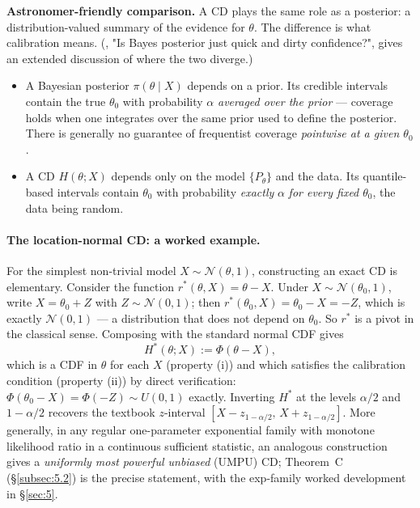 \documentclass[11pt]{article}
\providecommand{\tightlist}{\setlength{\itemsep}{0pt}\setlength{\parskip}{0pt}}
\begin{document}
\textbf{Astronomer-friendly comparison.} A CD plays the same role as a
posterior: a distribution-valued summary of the evidence for \(\theta\).
The difference is what calibration means. (\citealp{Fraser2011}, "Is
Bayes posterior just quick and dirty confidence?", gives an extended
discussion of where the two diverge.)

\begin{itemize}
\tightlist
\item
  A Bayesian posterior \(\pi(\theta \mid X)\) depends on a prior. Its
  credible intervals contain the true \(\theta_0\) with probability
  \(\alpha\) \emph{averaged over the prior} --- coverage holds when one
  integrates over the same prior used to define the posterior. There is
  generally no guarantee of frequentist coverage \emph{pointwise at a
  given \(\theta_0\)}.
\item
  A CD \(H(\theta; X)\) depends only on the model \(\{P_\theta\}\) and
  the data. Its quantile-based intervals contain \(\theta_0\) with
  probability \emph{exactly} \(\alpha\) \emph{for every fixed
  \(\theta_0\)}, the data being random.
\end{itemize}

\paragraph{The location-normal CD: a worked example.}
For the simplest non-trivial model \(X \sim \mathcal{N}(\theta, 1)\),
constructing an exact CD is elementary. Consider the function
\(r^*(\theta, X) = \theta - X\). Under \(X \sim \mathcal{N}(\theta_0, 1)\),
write \(X = \theta_0 + Z\) with \(Z \sim \mathcal{N}(0, 1)\); then
\(r^*(\theta_0, X) = \theta_0 - X = -Z\), which is exactly
\(\mathcal{N}(0, 1)\) --- a distribution that does not depend on
\(\theta_0\). So \(r^*\) is a pivot in the classical sense. Composing
with the standard normal CDF gives
\[
H^*(\theta; X) := \Phi(\theta - X),
\]
which is a CDF in \(\theta\) for each \(X\) (property (i)) and which
satisfies the calibration condition (property (ii)) by direct
verification: \(\Phi(\theta_0 - X) = \Phi(-Z) \sim U(0, 1)\) exactly.
Inverting \(H^*\) at the levels \(\alpha/2\) and \(1 - \alpha/2\)
recovers the textbook \(z\)-interval
\([X - z_{1-\alpha/2},\, X + z_{1-\alpha/2}]\). More generally, in any
regular one-parameter exponential family with monotone likelihood ratio
in a continuous sufficient statistic, an analogous construction gives a
\emph{uniformly most powerful unbiased} (UMPU) CD; Theorem~C
(\S\ref{subsec:5.2}) is the precise statement, with the exp-family
worked development in \S\ref{sec:5}.
\end{document}

